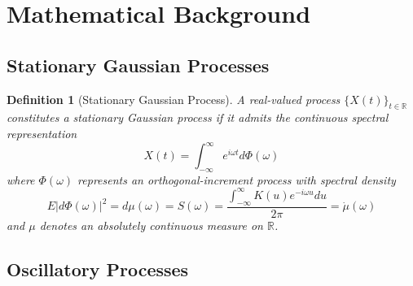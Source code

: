 \documentclass{article}
\newtheorem{definition}{Definition}
\begin{document}
\section{Mathematical Background}

\subsection{Stationary Gaussian Processes}

\begin{definition}
  [Stationary Gaussian Process]\label{def:stationary} A real-valued process
  $\{X (t)\}_{t \in \mathbb{R}}$ constitutes a stationary Gaussian process if
  it admits the continuous spectral representation
  \begin{equation}
    \label{eq:stationary_rep} X (t) = \int_{- \infty}^{\infty} e^{i \omega t}
    d \Phi (\omega)
  \end{equation}
  where $\Phi (\omega)$ represents an orthogonal-increment process with
  spectral density
  \begin{equation}
    E |d \Phi (\omega) |^2 = d \mu (\omega) = S (\omega) = \frac{\int_{-
    \infty}^{\infty} K (u) e^{- i \omega u} du}{2 \pi} = \dot{\mu} (\omega)
  \end{equation}
  and $\mu$ denotes an absolutely continuous measure on $\mathbb{R}$.
\end{definition}

\subsection{Oscillatory Processes}
\end{document}
